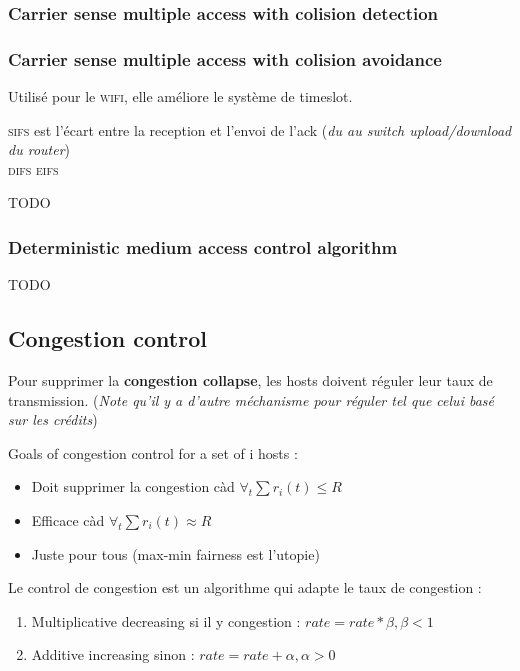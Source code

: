 \documentclass{report}
\begin{document}
\subsubsection{Carrier sense multiple access with colision detection}


\subsubsection{Carrier sense multiple access with colision avoidance}
Utilisé pour le \textsc{wifi}, elle améliore le système de timeslot.

\textsc{sifs} est l'écart entre la reception et l'envoi de l'ack (\textit{du au switch upload/download du router})\\
\textsc{difs} 
\textsc{eifs}

TODO

\subsubsection{Deterministic medium access control algorithm}
TODO

\subsection{Congestion control}

Pour supprimer la \textbf{congestion collapse}, les hosts doivent réguler leur taux
de transmission. (\textit{Note qu'il y a d'autre méchanisme pour réguler tel que celui
basé sur les crédits})

Goals of congestion control for a set of i hosts :
\begin{itemize}
    \item Doit supprimer la congestion càd $\forall_t \sum r_i(t) \leq R$
    \item Efficace càd $\forall_t \sum r_i(t) \approx R$
    \item Juste pour tous (max-min fairness est l'utopie)
\end{itemize}

Le control de congestion est un algorithme qui adapte le taux de congestion :
\begin{enumerate}
    \item Multiplicative decreasing si il y congestion : $rate = rate*\beta, \beta <1$
    \item Additive increasing sinon :  $rate =  rate + \alpha, \alpha>0$
\end{enumerate}
\end{document}
